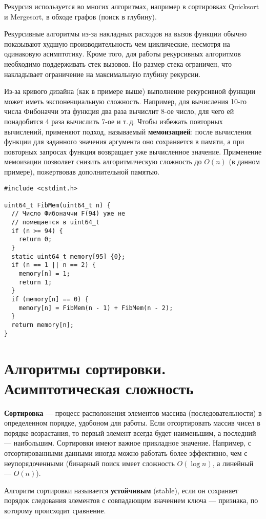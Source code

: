 Рекурсия используется во многих алгоритмах, например в сортировках Quicksort и Mergesort,
в обходе графов (поиск в глубину).

Рекурсивные алгоритмы из-за накладных расходов на вызов функции обычно показывают худшую
производительность чем циклические, несмотря на одинаковую
асимптотику. Кроме того, для работы рекурсивных алгоритмов необходимо поддерживать стек вызовов.
Но размер стека ограничен, что накладывает ограничение на максимальную глубину рекурсии.

Из-за кривого дизайна (как в примере выше) выполнение рекурсивной функции может иметь
экспоненциальную сложность. Например, для вычисления 10-го числа Фибоначчи эта функция
два раза вычислит 8-ое число, для чего ей понадобится 4 раза вычислить 7-ое и т.\,д. Чтобы
избежать повторных вычислений, применяют подход, называемый \textbf{мемоизацией}: после вычисления
функции для заданного значения аргумента оно сохраняется в памяти, а при повторных запросах функция
возвращает уже вычисленное значение. Применение мемоизации позволяет снизить алгоритмическую сложность
до $O(n)$ (в данном примере), пожертвовав дополнительной памятью.
\begin{verbatim}
#include <cstdint.h>

uint64_t FibMem(uint64_t n) {
  // Число Фибоначчи F(94) уже не
  // помещается в uint64_t
  if (n >= 94) {
    return 0;
  }
  static uint64_t memory[95] {0};
  if (n == 1 || n == 2) {
    memory[n] = 1;
    return 1;
  }
  if (memory[n] == 0) {
    memory[n] = FibMem(n - 1) + FibMem(n - 2);
  }
  return memory[n];
}
\end{verbatim}

\section{Алгоритмы сортировки. Асимптотическая сложность}
\textbf{Сортировка} --- процесс расположения элементов массива (последовательности) в определенном
порядке, удобоном для работы. Если отсортировать массив чисел в порядке возрастания, то первый элемент
всегда будет наименьшим, а последний --- наибольшим.
Сортировки имеют важное прикладное значение. Например, с отсортированными данными иногда можно
работать более эффективно, чем с неупорядоченными (бинарный поиск имеет сложность $O(\log n)$, а
линейный --- $O(n)$).

Алгоритм сортировки называется \textbf{устойчивым} (stable), если он сохраняет порядок следования
элементов с совпадающим значением ключа --- признака, по которому происходит сравнение.

